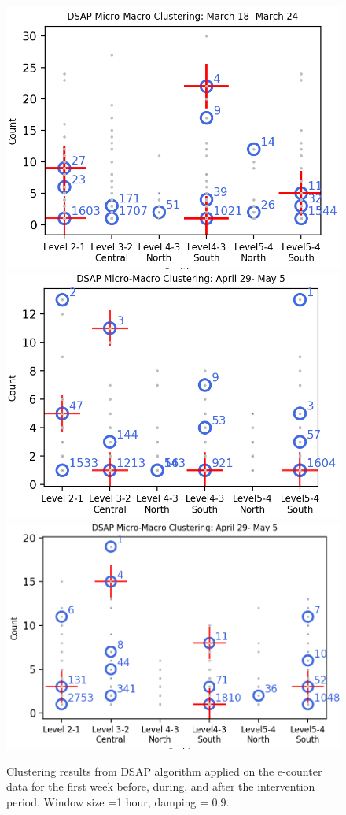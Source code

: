 \begin{figure}[!t]
    \centering
    \includegraphics[width=.47\textwidth]{image/Chapters/Chapter6/beforeInte1week.png}
    \includegraphics[width=.47\textwidth]{image/Chapters/Chapter6/duringInte1week.png}
    \includegraphics[width=.47\textwidth]{image/Chapters/Chapter6/afterInte1week.png}
    \caption{Clustering results from DSAP algorithm applied on the e-counter data for the first week before, during, and after the intervention period. Window size =1 hour, damping = 0.9.}
    \label{dsap3week}
\end{figure}








